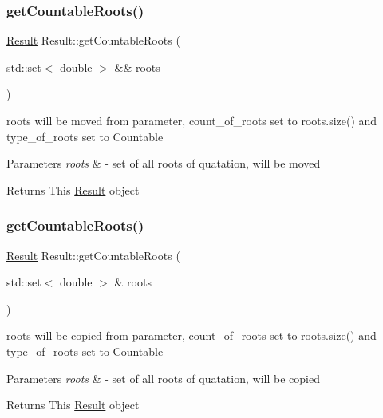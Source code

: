 \subsubsection{\texorpdfstring{get\+Countable\+Roots()}{getCountableRoots()}\hspace{0.1cm}{\footnotesize\ttfamily [1/2]}}
{\footnotesize\ttfamily \hyperlink{classResult}{Result} Result\+::get\+Countable\+Roots (\begin{DoxyParamCaption}\item[{std\+::set$<$ double $>$ \&\&}]{roots }\end{DoxyParamCaption})\hspace{0.3cm}{\ttfamily [static]}}

roots will be moved from parameter, count\+\_\+of\+\_\+roots set to roots.\+size() and type\+\_\+of\+\_\+roots set to Countable 
\begin{DoxyParams}{Parameters}
{\em roots} & -\/ set of all roots of quatation, will be moved \\
\hline
\end{DoxyParams}
\begin{DoxyReturn}{Returns}
This \hyperlink{classResult}{Result} object 
\end{DoxyReturn}
\mbox{\label{classResult_a4fd93039999c369636e4b9c9a5a23d6c}} 
\subsubsection{\texorpdfstring{get\+Countable\+Roots()}{getCountableRoots()}\hspace{0.1cm}{\footnotesize\ttfamily [2/2]}}
{\footnotesize\ttfamily \hyperlink{classResult}{Result} Result\+::get\+Countable\+Roots (\begin{DoxyParamCaption}\item[{std\+::set$<$ double $>$ \&}]{roots }\end{DoxyParamCaption})\hspace{0.3cm}{\ttfamily [static]}}

roots will be copied from parameter, count\+\_\+of\+\_\+roots set to roots.\+size() and type\+\_\+of\+\_\+roots set to Countable 
\begin{DoxyParams}{Parameters}
{\em roots} & -\/ set of all roots of quatation, will be copied \\
\hline
\end{DoxyParams}
\begin{DoxyReturn}{Returns}
This \hyperlink{classResult}{Result} object 
\end{DoxyReturn}
\mbox{\label{classResult_ae80743c03328802c58ee712ffc901f7e}} 
